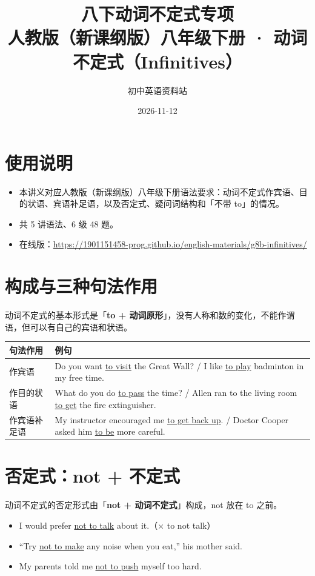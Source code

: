 \documentclass[11pt,a4paper]{ctexart}
\title{\textbf{八下动词不定式专项}\\[4pt]
\large 人教版（新课纲版）八年级下册 · 动词不定式（Infinitives）}
\author{初中英语资料站}
\date{2026-11-12}
\begin{document}
\maketitle

\section*{使用说明}
\begin{itemize}[leftmargin=1.4em]
\item 本讲义对应人教版（新课纲版）八年级下册语法要求：动词不定式作宾语、目的状语、宾语补足语，以及否定式、疑问词结构和「不带 to」的情况。
\item 共 5 讲语法、6 级 48 题。
\item 在线版：\url{https://1901151458-prog.github.io/english-materials/g8b-infinitives/}
\end{itemize}

\section{构成与三种句法作用}
动词不定式的基本形式是「\textbf{to + 动词原形}」，没有人称和数的变化，不能作谓语，但可以有自己的宾语和状语。
\begin{center}
\begin{tabular}{p{3.0cm}p{11.0cm}}
\hline
\textbf{句法作用} & \textbf{例句}\\
\hline
作宾语 & Do you want \underline{to visit} the Great Wall? / I like \underline{to play} badminton in my free time.\\
作目的状语 & What do you do \underline{to pass} the time? / Allen ran to the living room \underline{to get} the fire extinguisher.\\
作宾语补足语 & My instructor encouraged me \underline{to get back up}. / Doctor Cooper asked him \underline{to be} more careful.\\
\hline
\end{tabular}
\end{center}

\section{否定式：not + 不定式}
动词不定式的否定形式由「\textbf{not + 动词不定式}」构成，not 放在 to 之前。
\begin{itemize}[leftmargin=1.4em]
\item I would prefer \underline{not to talk} about it.（× to not talk）
\item ``Try \underline{not to make} any noise when you eat,'' his mother said.
\item My parents told me \underline{not to push} myself too hard.
\end{itemize}
\end{document}
